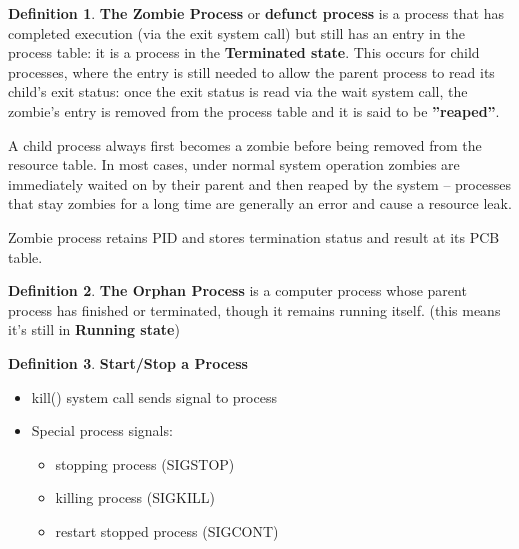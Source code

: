 \documentclass[11pt,a4paper]{article}
\theoremstyle{definition}
\newtheorem{definition}{Definition}[section]
\newenvironment{myitemize}
{ \begin{itemize}
    \setlength{\itemsep}{5pt}
    \setlength{\parskip}{0pt}
    \setlength{\parsep}{0pt}     }
{ \end{itemize}                  }
\begin{document}
\begin{definition}{\textbf{The Zombie Process}}
	or \textbf{defunct process} is a process that has completed execution (via the \textsf{exit} system call) but still has an entry in the process table: it is a process in the \textbf{Terminated state}. This occurs for child processes, where the entry is still needed to allow the parent process to read its child's \textsf{exit} status: once the \textsf{exit} status is read via the wait system call, the zombie's entry is removed from the process table and it is said to be \textbf{''reaped''}. 
	
	A child process always first becomes a zombie before being removed from the resource table. In most cases, under normal system operation zombies are immediately waited on by their parent and then reaped by the system – processes that stay zombies for a long time are generally an error and cause a resource leak.
	
	Zombie process retains PID and stores termination status and result at its PCB table.
\end{definition}

\begin{definition}{\textbf{The Orphan Process}}
	is a computer process whose parent process has finished or terminated, though it remains running itself. (this means it's still in \textbf{Running state})
\end{definition}

\begin{definition}{\textbf{Start/Stop a Process}}
	\begin{myitemize}
		\item kill() system call sends signal to process
		\item Special process signals:
		\begin{myitemize}
			\item stopping process (SIGSTOP)
			\item killing process (SIGKILL)
			\item restart stopped process (SIGCONT)
		\end{myitemize}
	\end{myitemize}
\end{definition}
\end{document}

